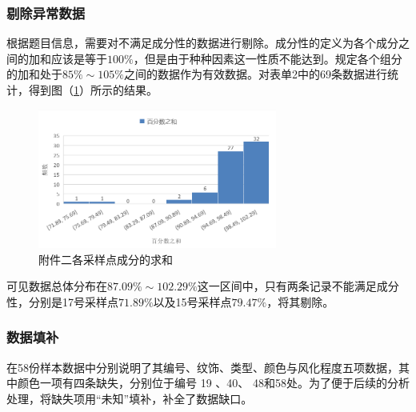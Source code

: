 \documentclass{my_paper}
\begin{document}
\subsubsection{剔除异常数据}
根据题目信息，需要对不满足成分性的数据进行剔除。成分性的定义为各个成分之间的加和应该是等于$ 100\% $，但是由于种种因素这一性质不能达到。规定各个组分的加和处于$85\%\sim 105\%$之间的数据作为有效数据。对表单2中的69条数据进行统计，得到图（\ref{51}）所示的结果。
\begin {figure}[h]
\centering %
\includegraphics[width=0.7\textwidth]{51.png}
\caption{附件二各采样点成分的求和} %
\label{51}
\end {figure}

可见数据总体分布在$87.09\%\sim 102.29\%$这一区间中，只有两条记录不能满足成分性，分别是17号采样点$71.89\%$以及15号采样点$79.47\%$，将其剔除。

\subsubsection{数据填补}
在58份样本数据中分别说明了其编号、纹饰、类型、颜色与风化程度五项数据，其中颜色一项有四条缺失，分别位于编号 19 、40、 48和58处。为了便于后续的分析处理，将缺失项用“未知”填补，补全了数据缺口。
\end{document}
